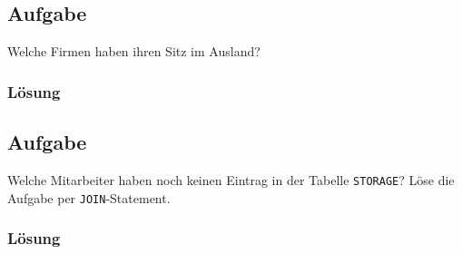 \subsection{Aufgabe}
\label{sec:uebung_01.aufgabe_14}
Welche Firmen haben ihren Sitz im Ausland?

\subsubsection*{Lösung}
\label{sec:uebung_01.aufgabe_14.loesung}

\subsection{Aufgabe}
\label{sec:uebung_01.aufgabe_15}
Welche Mitarbeiter haben noch keinen Eintrag in der Tabelle \texttt{STORAGE}? Löse die Aufgabe per \texttt{JOIN}-Statement.

\subsubsection*{Lösung}
\label{sec:uebung_01.aufgabe_15.loesung}

